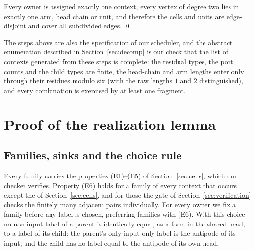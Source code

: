 \documentclass[11pt,a4paper]{article}
\theoremstyle{plain}
\theoremstyle{definition}
\theoremstyle{remark}
\begin{document}
Every owner is assigned exactly one context, every vertex of degree two lies
in exactly one arm, head chain or unit, and therefore the cells and units are
edge-disjoint and cover all subdivided edges.  \qed

The steps above are also the specification of our scheduler,
and the abstract enumeration described in Section~\ref{sec:decomp} is
our check that the list of contexts generated from these steps is complete:
the residual types, the port counts and the child types are finite, the
head-chain and arm lengths enter only through their residues modulo six
(with the raw lengths $1$ and $2$ distinguished), and every combination is
exercised by at least one fragment.


\section{Proof of the realization lemma}\label{app:realization}

\subsection*{Families, sinks and the choice rule}

Every family carries the properties (E1)--(E5) of Section~\ref{sec:cells},
which our checker verifies.  Property (E6) holds for a family of every context
that occurs except the \NumNotEsixContexts{} of Section~\ref{sec:cells}, and
for those the gate of Section~\ref{sec:verification} checks the finitely many
adjacent pairs individually.  For every owner we fix a family before any label
is chosen, preferring families with (E6).  With this choice no non-input label
of a parent is identically equal, as a form in the shared head, to a label of
its child: the parent's only input-only label is the antipode of its input, and
the child has no label equal to the antipode of its own head.
\end{document}
